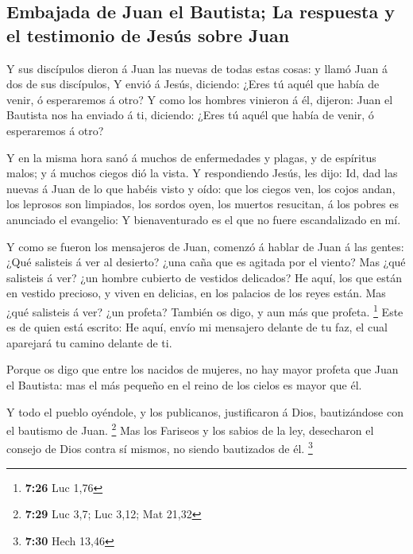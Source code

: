 \hypertarget{embajada-de-juan-el-bautista-la-respuesta-y-el-testimonio-de-jesuxfas-sobre-juan}{%
\subsection{Embajada de Juan el Bautista; La respuesta y el testimonio
de Jesús sobre
Juan}\label{embajada-de-juan-el-bautista-la-respuesta-y-el-testimonio-de-jesuxfas-sobre-juan}}

 Y sus discípulos dieron á Juan las nuevas de todas estas
cosas: y llamó Juan á dos de sus discípulos,  Y envió á
Jesús, diciendo: ¿Eres tú aquél que había de venir, ó esperaremos á
otro?  Y como los hombres vinieron á él, dijeron: Juan el
Bautista nos ha enviado á ti, diciendo: ¿Eres tú aquél que había de
venir, ó esperaremos á otro?

 Y en la misma hora sanó á muchos de enfermedades y plagas,
y de espíritus malos; y á muchos ciegos dió la vista.  Y
respondiendo Jesús, les dijo: Id, dad las nuevas á Juan de lo que habéis
visto y oído: que los ciegos ven, los cojos andan, los leprosos son
limpiados, los sordos oyen, los muertos resucitan, á los pobres es
anunciado el evangelio:  Y bienaventurado es el que no
fuere escandalizado en mí.

 Y como se fueron los mensajeros de Juan, comenzó á hablar
de Juan á las gentes: ¿Qué salisteis á ver al desierto? ¿una caña que es
agitada por el viento?  Mas ¿qué salisteis á ver? ¿un
hombre cubierto de vestidos delicados? He aquí, los que están en vestido
precioso, y viven en delicias, en los palacios de los reyes están.
 Mas ¿qué salisteis á ver? ¿un profeta? También os digo, y
aun más que profeta. \footnote{\textbf{7:26} Luc 1,76} 
Este es de quien está escrito: He aquí, envío mi mensajero delante de tu
faz, el cual aparejará tu camino delante de ti.

 Porque os digo que entre los nacidos de mujeres, no hay
mayor profeta que Juan el Bautista: mas el más pequeño en el reino de
los cielos es mayor que él.

 Y todo el pueblo oyéndole, y los publicanos, justificaron
á Dios, bautizándose con el bautismo de Juan. \footnote{\textbf{7:29}
  Luc 3,7; Luc 3,12; Mat 21,32}  Mas los Fariseos y los
sabios de la ley, desecharon el consejo de Dios contra sí mismos, no
siendo bautizados de él. \footnote{\textbf{7:30} Hech 13,46}

